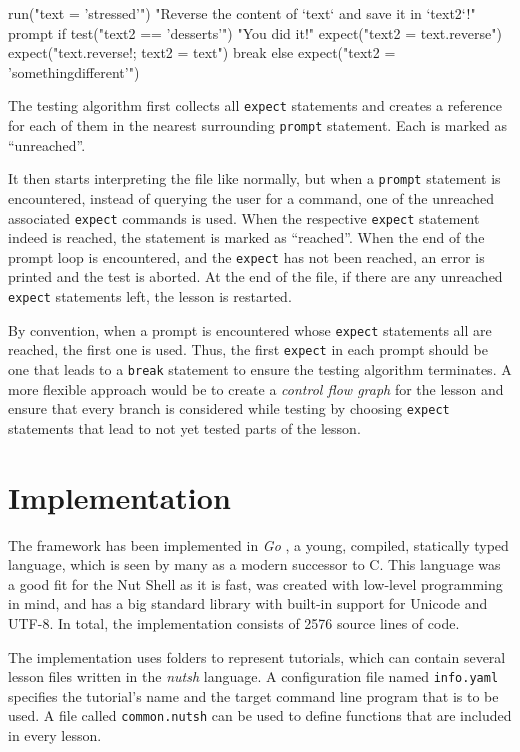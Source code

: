 \documentclass[paper=a4,abstract=on,cleardoublepage=empty,numbers=noenddot,toc=bib,12pt,appendixprefix=true]{scrreprt}
\begin{document}
\begin{nutsh}
run("text = 'stressed'")
"Reverse the content of `text` and save it in `text2`!"
prompt {
    if test("text2 == 'desserts'") {
        "You did it!"
        expect("text2 = text.reverse")
        expect("text.reverse!; text2 = text")
        break
    } else {
        expect("text2 = 'somethingdifferent'")
    }
}
\end{nutsh}

The testing algorithm first collects all \texttt{expect} statements and creates a reference for each of them in the nearest surrounding \texttt{prompt} statement. Each is marked as “unreached”.

It then starts interpreting the file like normally, but when a \texttt{prompt} statement is encountered, instead of querying the user for a command, one of the unreached associated \texttt{expect} commands is used. When the respective \texttt{expect} statement indeed is reached, the statement is marked as “reached”. When the end of the prompt loop is encountered, and the \texttt{expect} has not been reached, an error is printed and the test is aborted. At the end of the file, if there are any unreached \texttt{expect} statements left, the lesson is restarted.

By convention, when a prompt is encountered whose \texttt{expect} statements all are reached, the first one is used. Thus, the first \texttt{expect} in each prompt should be one that leads to a \texttt{break} statement to ensure the testing algorithm terminates. A more flexible approach would be to create a \emph{control flow graph} for the lesson and ensure that every branch is considered while testing by choosing \texttt{expect} statements that lead to not yet tested parts of the lesson.

\chapter{Implementation}
\label{sec:implementation}

The framework has been implemented in \emph{Go} \cite{google13}, a young, compiled, statically typed language, which is seen by many as a modern successor to C. This language was a good fit for the Nut Shell as it is fast, was created with low-level programming in mind, and has a big standard library with built-in support for Unicode and UTF-8. In total, the implementation consists of 2576 source lines of code.

The implementation uses folders to represent tutorials, which can contain several lesson files written in the \emph{nutsh} language. A configuration file named \texttt{info.yaml} specifies the tutorial's name and the target command line program that is to be used. A file called \texttt{common.nutsh} can be used to define functions that are included in every lesson.
\end{document}

